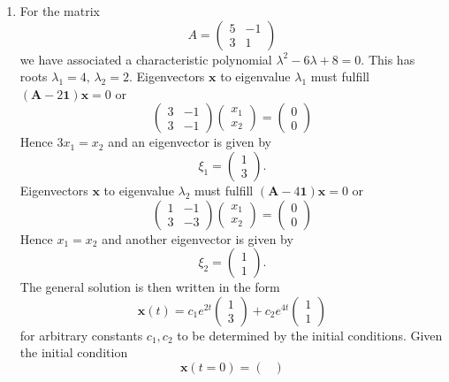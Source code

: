 \documentclass[a4paper,12pt,leqno]{article}
\begin{document}
\begin{enumerate}
\item For the matrix 
\[A =  \begin{pmatrix}
5 & -1 \\
3 & 1 
\end{pmatrix}\]
we have associated a characteristic polynomial $\lambda^2 - 6\lambda + 8 = 0.$ This has roots $\lambda_1 = 4, \, \lambda_2 = 2.$
Eigenvectors $\mathbf{x}$ to eigenvalue $\lambda_1$ must fulfill $(\mathbf{A} - 2 \mathbf{1})\mathbf{x} = 0$ or 
\[ \begin{pmatrix}
3 & -1 \\
3 & -1 
\end{pmatrix}
\begin{pmatrix}
x_1 \\
x_2
\end{pmatrix}
= 
\begin{pmatrix}
0 \\
0
\end{pmatrix} \]
Hence $3x_1 = x_2$ and an eigenvector is given by
\[ \xi_1 = \begin{pmatrix}
1 \\
3
\end{pmatrix}.
\]
Eigenvectors $\mathbf{x}$ to eigenvalue $\lambda_2$ must fulfill $(\mathbf{A} - 4 \mathbf{1})\mathbf{x} = 0$ or 
\[ \begin{pmatrix}
1 & -1 \\
3 & -3 
\end{pmatrix}
\begin{pmatrix}
x_1 \\
x_2
\end{pmatrix}
= 
\begin{pmatrix}
0 \\
0
\end{pmatrix} \]
Hence $x_1 = x_2$ and another eigenvector is given by
\[ \xi_2 = \begin{pmatrix}
1 \\
1
\end{pmatrix}.
\]
The general solution is then written in the form 
\[ \mathbf{x}(t) = c_1 e^{2t} \begin{pmatrix}
1 \\
3
\end{pmatrix}
+ c_2 e^{4t} \begin{pmatrix}
1 \\
1
\end{pmatrix} \]
for arbitrary constants $c_1, c_2$ to be determined by the initial conditions. 
Given the initial condition 
\[ \mathbf{x}(t=0) = \begin{pmatrix}

\end{pmatrix}\]
\end{enumerate}
\end{document}

